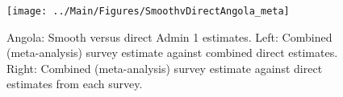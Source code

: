 \documentclass[12pt]{article}\usepackage[]{graphicx}\usepackage[]{color}
\newenvironment{knitrout}{}{} %
\begin{document}




\begin{knitrout}
\color{fgcolor}\begin{figure}[bht]

{\centering \texttt{[image: ../Main/Figures/SmoothvDirectAngola\_meta]} 

}

\caption[Angola]{Angola: Smooth versus direct Admin 1 estimates. Left: Combined (meta-analysis) survey estimate against combined direct estimates. Right: Combined (meta-analysis) survey estimate against direct estimates from each survey.}\label{fig:unnamed-chunk-3}
\end{figure}


\end{knitrout}
\end{document}
